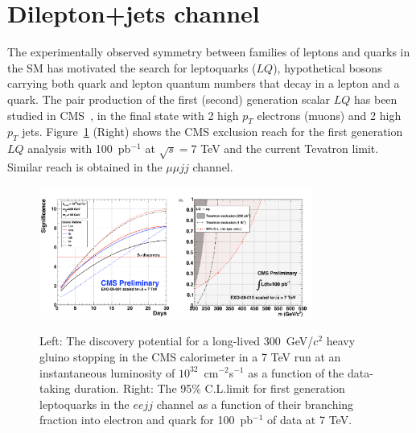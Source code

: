 \documentclass{PoS}
\begin{document}
\section{Dilepton+jets channel} \label{leptonjet}
The experimentally observed symmetry between families of  
leptons and quarks in the SM has motivated the search for leptoquarks ($LQ$), 
hypothetical bosons carrying both quark and lepton quantum numbers 
that decay in a lepton and a quark.
The pair production of the first (second) generation scalar $LQ$ has been studied in CMS~\cite{LQPAS}, 
in the final state with 2 high $p_T$ electrons (muons) and 2 high $p_T$ jets. 
Figure~\ref{fig:StoppedHadron_LQ} (Right) shows the CMS exclusion reach for the first generation $LQ$ analysis 
with 100~pb$^{-1}$ at $\sqrt{s} = 7$ TeV and the current Tevatron limit. Similar reach is obtained in the $\mu\mu jj$ channel.

\begin{figure}[htbp] 
\centering
\includegraphics[width=0.4\textwidth]{SG1.pdf}\includegraphics[width=0.4\textwidth]{LQ1_95.pdf}  
\caption{Left: The discovery potential for a long-lived 300~GeV/$c^2$ heavy gluino stopping in the CMS calorimeter 
in a 7 TeV run at an instantaneous luminosity of $10^{32}$~cm$^{-2}$s$^{-1}$ as a function of the data-taking 
duration. Right: The 95\% C.L.limit for first generation leptoquarks in the $ee jj$ channel as 
a function of their branching fraction into electron and quark for 100~pb$^{-1}$ of data at 7 TeV.}
\label{fig:StoppedHadron_LQ}
\end{figure}
\end{document}
